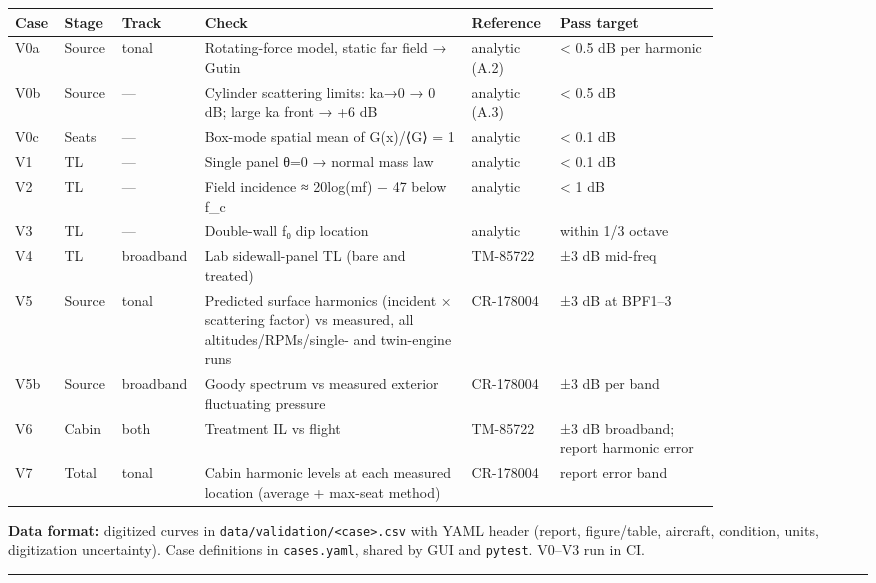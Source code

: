 \documentclass[10pt,a4paper]{article}
\begin{document}
{\small
\begin{longtable}{>{\raggedright\arraybackslash}p{0.041\linewidth}>{\raggedright\arraybackslash}p{0.051\linewidth}>{\raggedright\arraybackslash}p{0.066\linewidth}>{\raggedright\arraybackslash}p{0.357\linewidth}>{\raggedright\arraybackslash}p{0.092\linewidth}>{\raggedright\arraybackslash}p{0.214\linewidth}}
\hline
\textbf{Case} & \textbf{Stage} & \textbf{Track} & \textbf{Check} & \textbf{Reference} & \textbf{Pass target} \\
\hline
\endhead
V0a & Source & tonal & Rotating-force model, static far field → Gutin & analytic (A.2) & < 0.5 dB per harmonic \\
V0b & Source & — & Cylinder scattering limits: ka→0 → 0 dB; large ka front → +6 dB & analytic (A.3) & < 0.5 dB \\
V0c & Seats & — & Box-mode spatial mean of G(x)/⟨G⟩ = 1 & analytic & < 0.1 dB \\
V1 & TL & — & Single panel θ=0 → normal mass law & analytic & < 0.1 dB \\
V2 & TL & — & Field incidence ≈ 20log(mf) − 47 below f\_c & analytic & < 1 dB \\
V3 & TL & — & Double-wall f₀ dip location & analytic & within 1/3 octave \\
V4 & TL & broadband & Lab sidewall-panel TL (bare and treated) & TM-85722 & ±3 dB mid-freq \\
V5 & Source & tonal & Predicted surface harmonics (incident × scattering factor) vs measured, all altitudes/RPMs/single- and twin-engine runs & CR-178004 & ±3 dB at BPF1–3 \\
V5b & Source & broadband & Goody spectrum vs measured exterior fluctuating pressure & CR-178004 & ±3 dB per band \\
V6 & Cabin & both & Treatment IL vs flight & TM-85722 & ±3 dB broadband; report harmonic error \\
V7 & Total & tonal & Cabin harmonic levels at each measured location (average + max-seat method) & CR-178004 & report error band \\
\hline
\end{longtable}}

\textbf{Data format:} digitized curves in \texttt{data/\allowbreak{}validation/\allowbreak{}<case>.\allowbreak{}csv} with YAML header (report, figure/table, aircraft, condition, units, digitization uncertainty). Case definitions in \texttt{cases.\allowbreak{}yaml}, shared by GUI and \texttt{pytest}. V0–V3 run in CI.

\noindent\rule{\linewidth}{0.4pt}
\end{document}
